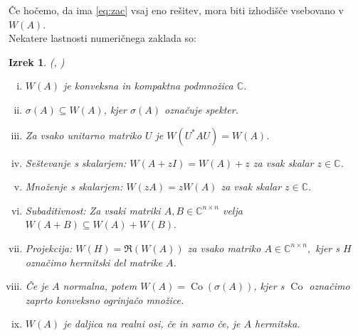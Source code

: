 \documentclass[12pt,a4paper]{amsart}
\theoremstyle{definition}
\theoremstyle{plain}
\newtheorem{izrek}[definicija]{Izrek}
\newcommand{\Co}{\operatorname{Co}} %
\newcommand{\C}{\mathbb C}
\begin{document}
Če hočemo, da ima \eqref{eq:zac} vsaj eno rešitev, mora biti izhodišče vsebovano v $W(A)$. \\

Nekatere lastnosti numeričnega zaklada so:

\begin{izrek} (\cite{num}, \cite{zaloga})
\begin{enumerate}[(i)]
\item \label{l1} $W(A)$ je konveksna in kompaktna podmnožica $\C$.
\item \label{l2} $\sigma(A)\subseteq W(A)$, kjer $\sigma(A)$ označuje spekter.
\item \label{l3} Za vsako unitarno matriko $U$ je $W(U^\ast AU)=W(A).$
\item \label{l4} Seštevanje s skalarjem: $W(A+zI)=W(A)+z$ za vsak skalar $z \in \C$.
\item \label{l5} Množenje s skalarjem: $W(zA)=zW(A)$ za vsak skalar $z \in \C$.
\item \label{l6} Subaditivnost: Za vsaki matriki $A, B \in \C^{n\times n}$ velja $W(A+B) \subseteq W(A) +W(B).$
\item \label{l7} Projekcija: $W(H)= \Re( W(A))$ za vsako matriko $A\in \C^{n\times n},$ kjer s $H$ označimo hermitski del matrike $A$.
\item \label{l8} Če je $A$ normalna, potem $W(A)=\Co(\sigma(A))$, kjer s $\Co$ označimo zaprto konveksno ogrinjačo množice.
\item \label{l9} $W(A)$ je daljica na realni osi, če in samo če, je $A$ hermitska.
\end{enumerate}
\end{izrek}
\end{document}
